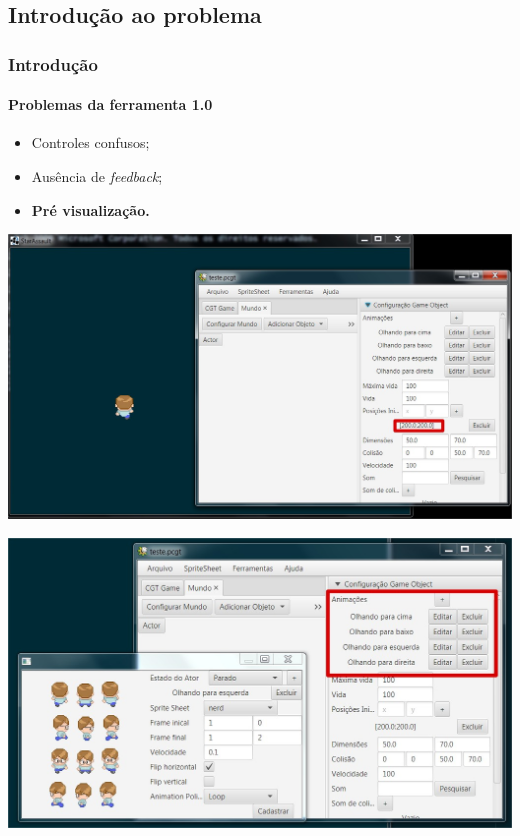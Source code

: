 \documentclass{beamer}
\begin{document}
   \subsection{Introdução ao problema}
   \begin{frame}
      \frametitle{Introdução}
      \framesubtitle{Problemas da ferramenta 1.0}
      \begin{itemize}
         \item Controles confusos;
         \item Ausência de \emph{feedback};
         \item \textbf{Pré visualização.}
      \end{itemize}
   \end{frame}
   \begin{frame}
      \includegraphics[width=\textwidth]{images/problema-1.jpg}
   \end{frame}

   \begin{frame}
      \includegraphics[width=\textwidth]{images/problema-2.jpg}
   \end{frame}
\end{document}
